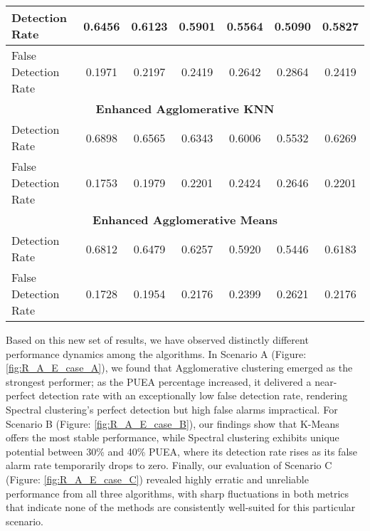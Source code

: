 \begin{table}[h]
{\begin{tabular}{|l|c|c|c|c|c|c|}
\hline
Detection Rate & 0.6456 & 0.6123 & 0.5901 & 0.5564 & 0.5090 & 0.5827 \\
\hline
False Detection Rate & 0.1971 & 0.2197 & 0.2419 & 0.2642 & 0.2864 & 0.2419 \\
\hline
\multicolumn{7}{|c|}{\textbf{Enhanced Agglomerative KNN}} \\
\hline
Detection Rate & 0.6898 & 0.6565 & 0.6343 & 0.6006 & 0.5532 & 0.6269 \\
\hline
False Detection Rate & 0.1753 & 0.1979 & 0.2201 & 0.2424 & 0.2646 & 0.2201 \\
\hline
\multicolumn{7}{|c|}{\textbf{Enhanced Agglomerative Means}} \\
\hline
Detection Rate & 0.6812 & 0.6479 & 0.6257 & 0.5920 & 0.5446 & 0.6183 \\
\hline
False Detection Rate & 0.1728 & 0.1954 & 0.2176 & 0.2399 & 0.2621 & 0.2176 \\
\hline
\end{tabular}%
}
\end{table}


\clearpage


Based on this new set of results, we have observed distinctly different performance dynamics among the algorithms. In Scenario A (Figure: \ref{fig:R_A_E_case_A}), we found that Agglomerative clustering emerged as the strongest performer; as the PUEA percentage increased, it delivered a near-perfect detection rate with an exceptionally low false detection rate, rendering Spectral clustering's perfect detection but high false alarms impractical. For Scenario B (Figure: \ref{fig:R_A_E_case_B}), our findings show that K-Means offers the most stable performance, while Spectral clustering exhibits unique potential between 30\% and 40\% PUEA, where its detection rate rises as its false alarm rate temporarily drops to zero. Finally, our evaluation of Scenario C (Figure: \ref{fig:R_A_E_case_C}) revealed highly erratic and unreliable performance from all three algorithms, with sharp fluctuations in both metrics that indicate none of the methods are consistently well-suited for this particular scenario.\\


